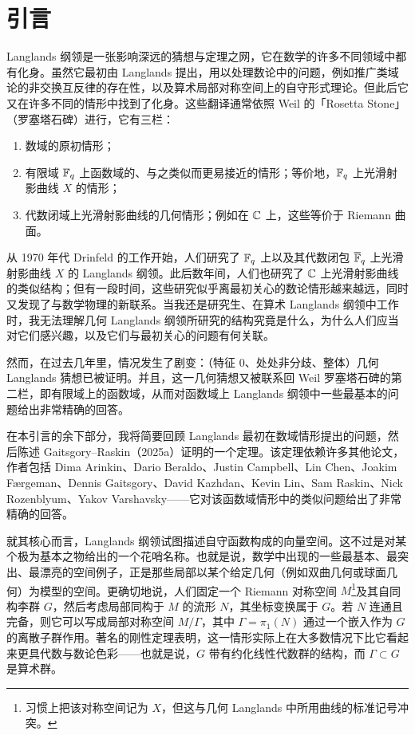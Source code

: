 \section{引言}

Langlands 纲领是一张影响深远的猜想与定理之网，它在数学的许多不同领域中都有化身。虽然它最初由 Langlands 提出，用以处理数论中的问题，例如推广类域论的非交换互反律的存在性，以及算术局部对称空间上的自守形式理论。但此后它又在许多不同的情形中找到了化身。这些翻译通常依照 Weil 的「Rosetta Stone」（罗塞塔石碑）进行，它有三栏：
\begin{enumerate}
\item 数域的原初情形；
\item 有限域 $\mathbb{F}_{q}$ 上函数域的、与之类似而更易接近的情形；等价地，$\mathbb{F}_{q}$ 上光滑射影曲线 $X$ 的情形；
\item 代数闭域上光滑射影曲线的几何情形；例如在 $\mathbb{C}$ 上，这些等价于 Riemann 曲面。
\end{enumerate}

从 1970 年代 Drinfeld 的工作开始，人们研究了 $\mathbb{F}_{q}$ 上以及其代数闭包 $\overline{\mathbb{F}}_q$ 上光滑射影曲线 $X$ 的 Langlands 纲领。此后数年间，人们也研究了 $\mathbb{C}$ 上光滑射影曲线的类似结构；但有一段时间，这些研究似乎离最初关心的数论情形越来越远，同时又发现了与数学物理的新联系。当我还是研究生、在算术 Langlands 纲领中工作时，我无法理解几何 Langlands 纲领所研究的结构究竟是什么，为什么人们应当对它们感兴趣，以及它们与最初关心的问题有何关联。

然而，在过去几年里，情况发生了剧变：（特征 $0$、处处非分歧、整体）几何 Langlands 猜想已被证明。并且，这一几何猜想又被联系回 Weil 罗塞塔石碑的第二栏，即有限域上的函数域，从而对函数域上 Langlands 纲领中一些最基本的问题给出非常精确的回答。

在本引言的余下部分，我将简要回顾 Langlands 最初在数域情形提出的问题，然后陈述 Gaitsgory–Raskin（2025a）证明的一个定理。该定理依赖许多其他论文，作者包括 Dima Arinkin、Dario Beraldo、Justin Campbell、Lin Chen、Joakim Færgeman、Dennis Gaitsgory、David Kazhdan、Kevin Lin、Sam Raskin、Nick Rozenblyum、Yakov Varshavsky——它对该函数域情形中的类似问题给出了非常精确的回答。

就其核心而言，Langlands 纲领试图描述自守函数构成的向量空间。这不过是对某个极为基本之物给出的一个花哨名称。也就是说，数学中出现的一些最基本、最突出、最漂亮的空间例子，正是那些局部以某个给定几何（例如双曲几何或球面几何）为模型的空间。更确切地说，人们固定一个 Riemann 对称空间 $M$\footnote{习惯上把该对称空间记为 $X$，但这与几何 Langlands 中所用曲线的标准记号冲突。}及其自同构李群 $G$，然后考虑局部同构于 $M$ 的流形 $N$，其坐标变换属于 $G$。若 $N$ 连通且完备，则它可以写成局部对称空间 $M/\Gamma$，其中 $\Gamma=\pi_1(N)$ 通过一个嵌入作为 $G$ 的离散子群作用。著名的刚性定理表明，这一情形实际上在大多数情况下比它看起来更具代数与数论色彩——也就是说，$G$ 带有约化线性代数群的结构，而 $\Gamma\subset G$ 是算术群。

